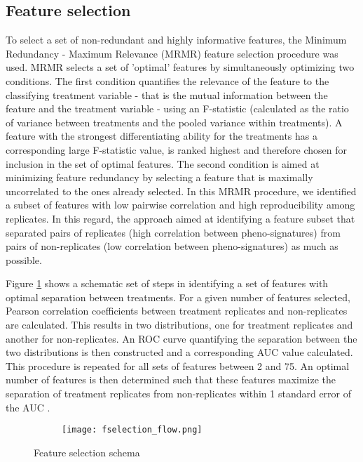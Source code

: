 \documentclass[11pt]{article}
\begin{document}
\subsection{Feature selection}\label{fselection}
\par{To select a set of non-redundant and highly informative features, the Minimum Redundancy - Maximum Relevance (MRMR) feature selection \cite{DeJay2013, Ding2005} procedure was used. MRMR selects a set of 'optimal' features by simultaneously optimizing two conditions. The first condition quantifies the relevance of the feature to the classifying treatment variable - that is the mutual information between the feature and the treatment variable - using an F-statistic (calculated as the ratio of variance between treatments and the pooled variance within treatments). A feature with the strongest differentiating ability for the treatments has a corresponding large F-statistic value, is ranked highest and therefore chosen for inclusion in the set of optimal features. The second condition is aimed at minimizing feature redundancy by selecting a feature that is maximally uncorrelated to the ones already selected. In this MRMR procedure, we identified a subset of features with low pairwise correlation and high reproducibility among replicates. In this regard, the approach aimed at identifying a feature subset that separated pairs of replicates (high correlation between pheno-signatures) from pairs of non-replicates (low correlation between pheno-signatures) as much as possible.}
\par{Figure \ref{fselectionflow} shows a schematic set of steps in identifying a set of features with optimal separation between treatments. For a given number of features selected, Pearson correlation coefficients \cite{Nachtsheim2004} between treatment replicates and non-replicates are calculated. This results in two distributions, one for treatment replicates and another for non-replicates. An ROC curve quantifying the separation between the two distributions is then constructed and a corresponding AUC value calculated. This procedure is repeated for all sets of features between 2 and 75. An optimal number of features is then determined such that these features maximize the separation of treatment replicates from non-replicates within 1 standard error of the AUC .

\begin{figure}[ht!] 
\centering
  \begin{subfigure}[b]{1\linewidth}
    \centering
    \texttt{[image: fselection\_flow.png]} 
     \vspace{1ex}
  \end{subfigure}%
  \caption{Feature selection schema}
  \label{fselectionflow} 
\end{figure}
}
\end{document}
